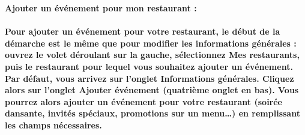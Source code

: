 \begin{description}
    \item \bf{Ajouter un événement pour mon restaurant :} \\ \\
    Pour ajouter un événement pour votre restaurant, le début de la démarche est le même que pour modifier les informations générales : ouvrez le volet déroulant sur la gauche, sélectionnez \og{}Mes restaurants\fg{}, puis le restaurant pour lequel vous souhaitez ajouter un événement. Par défaut, vous arrivez sur l'onglet \og{}Informations générales\fg{}. Cliquez alors sur l'onglet \og{}Ajouter événement\fg{} (quatrième onglet en bas). Vous pourrez alors ajouter un événement pour votre restaurant (soirée dansante, invités spéciaux, promotions sur un menu\dots) en remplissant les champs nécessaires. \\
    
\end{description}